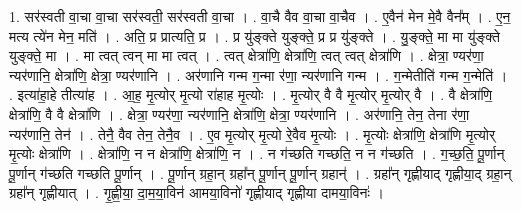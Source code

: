 \documentclass[17pt]{extarticle}
\begin{document}
1. सर॑स्वती वा॒चा वा॒चा सर॑स्वती॒ सर॑स्वती वा॒चा । . वा॒चै वैव वा॒चा वा॒चैव । . ए॒वैन॑ मेन मे॒वै वैन᳚म् । . ए॒न॒ मत्य त्ये॑न मेन॒ मति॑ । . अति॒ प्र प्रात्यति॒ प्र । . प्र यु॑ङ्क्ते युङ्क्ते॒ प्र प्र यु॑ङ्क्ते । . यु॒ङ्क्ते॒ मा मा यु॑ङ्क्ते युङ्क्ते॒ मा । . मा त्वत् त्वन् मा मा त्वत् । . त्वत् क्षेत्रा॑णि॒ क्षेत्रा॑णि॒ त्वत् त्वत् क्षेत्रा॑णि । . क्षेत्रा॒ ण्यर॑णा॒ न्यर॑णानि॒ क्षेत्रा॑णि॒ क्षेत्रा॒ ण्यर॑णानि । . अर॑णानि गन्म ग॒न्मा र॑णा॒ न्यर॑णानि गन्म । . ग॒न्मेतीति॑ गन्म ग॒न्मेति॑ । . इत्या॑हा॒हे तीत्या॑ह । . आ॒ह॒ मृ॒त्योर् मृ॒त्यो रा॑हाह मृ॒त्योः । . मृ॒त्योर् वै वै मृ॒त्योर् मृ॒त्योर् वै । . वै क्षेत्रा॑णि॒ क्षेत्रा॑णि॒ वै वै क्षेत्रा॑णि । . क्षेत्रा॒ ण्यर॑णा॒ न्यर॑णानि॒ क्षेत्रा॑णि॒ क्षेत्रा॒ ण्यर॑णानि । . अर॑णानि॒ तेन॒ तेना र॑णा॒ न्यर॑णानि॒ तेन॑ । . तेनै॒ वैव तेन॒ तेनै॒व । . ए॒व मृ॒त्योर् मृ॒त्यो रे॒वैव मृ॒त्योः । . मृ॒त्योः क्षेत्रा॑णि॒ क्षेत्रा॑णि मृ॒त्योर् मृ॒त्योः क्षेत्रा॑णि । . क्षेत्रा॑णि॒ न न क्षेत्रा॑णि॒ क्षेत्रा॑णि॒ न । . न ग॑च्छति गच्छति॒ न न ग॑च्छति । . ग॒च्छ॒ति॒ पू॒र्णान् पू॒र्णान् ग॑च्छति गच्छति पू॒र्णान् । . पू॒र्णान् ग्रहा॒न् ग्रहा᳚न् पू॒र्णान् पू॒र्णान् ग्रहान्॑ । . ग्रहा᳚न् गृह्णीयाद् गृह्णीया॒द् ग्रहा॒न् ग्रहा᳚न् गृह्णीयात् । . गृ॒ह्णी॒या॒ दा॒म॒या॒विन॑ आमया॒विनो॑ गृह्णीयाद् गृह्णीया दामया॒विनः॑ । \newline
\end{document}
